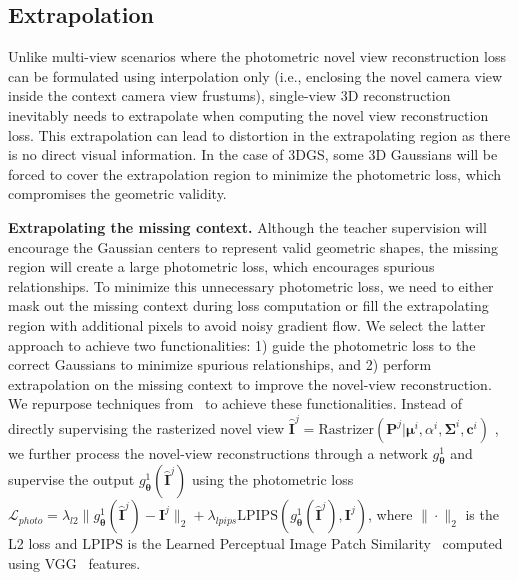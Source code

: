 \documentclass{article} %
\begin{document}
\subsection{Extrapolation} 
Unlike multi-view scenarios where the photometric novel view reconstruction loss can be formulated using interpolation only (i.e., enclosing the novel camera view inside the context camera view frustums), single-view 3D reconstruction inevitably needs to extrapolate when computing the novel view reconstruction loss. This extrapolation can lead to distortion in the extrapolating region as there is no direct visual information. In the case of 3DGS, some 3D Gaussians will be forced to cover the extrapolation region to minimize the photometric loss, which compromises the geometric validity.

\textbf{Extrapolating the missing context.}
Although the teacher supervision will encourage the Gaussian centers to represent valid geometric shapes, the missing region will create a large photometric loss, which encourages spurious relationships. To minimize this unnecessary photometric loss, we need to either mask out the missing context during loss computation or fill the extrapolating region with additional pixels to avoid noisy gradient flow. We select the latter approach to achieve two functionalities: 1) guide the photometric loss to the correct Gaussians to minimize spurious relationships, and 2) perform extrapolation on the missing context to improve the novel-view reconstruction. We repurpose techniques from~\citep{luo2018single,ruckert2022adop} to achieve these functionalities. Instead of directly supervising the rasterized novel view $\hat{\bm{I}}^j=\mathrm{Rastrizer}(\mathbf{P}^j|\bm{\mu}^i, \alpha^i, \bm{\Sigma}^i, \bm{c}^i)$ , we further process the novel-view reconstructions through a network $g^{1}_{\bm \theta}$ and supervise the output $g^{1}_{\bm \theta}(\hat{\bm{I}}^j)$ using the photometric loss $\mathcal{L}_{photo}=\lambda_{l2}\|g^{1}_{\bm \theta}(\hat{\bm{I}}^j)-\bm I^j\|_2+\lambda_{lpips}\mathrm{LPIPS}(g^{1}_{\bm \theta}(\hat{\bm{I}}^j),\bm I^j)$, where $\|\cdot\|_2$ is the L2 loss and $\mathrm{LPIPS}$ is the Learned Perceptual Image Patch Similarity~\citep{zhang2018unreasonable} computed using VGG~\citep{simonyan2014very} features.
\end{document}
